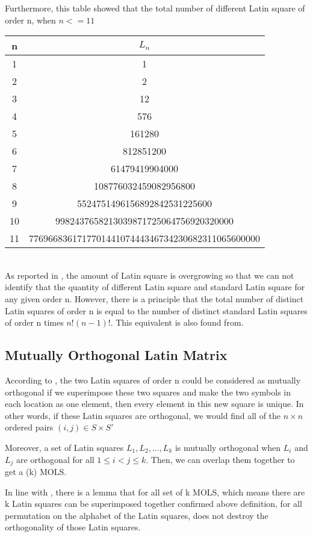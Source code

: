 \documentclass[12pt]{article}
\begin{document}
Furthermore, this table showed that the total number of different Latin square of order n, when $n <= 11$


\begin{tabular}{|c|c|}
\hline
n & $L_n$\\
\hline
1&1\\
2&2\\
3&12\\
4&576\\
5&161280\\
6&812851200\\
7&61479419904000\\
8&108776032459082956800\\
9&5524751496156892842531225600\\
10&9982437658213039871725064756920320000\\
11&776966836171770144107444346734230682311065600000\\
\hline
\end{tabular} \\

As reported in \cite{ref1}, the amount of Latin square is overgrowing so that we can not identify that the quantity of different Latin square and standard Latin square for any given order n. However, there is a principle that the total number of distinct Latin squares of order n is equal to the number of distinct standard Latin squares of order n times $n! (n - 1)!$. This equivalent is also found from\cite{ref2}.

\subsection{Mutually Orthogonal Latin Matrix}

According to \cite{ref11}, the two Latin squares of order n could be considered as mutually orthogonal if we superimpose these two squares and make the two symbols in each location as one element, then every element in this new square is unique. In other words, if these Latin squares are orthogonal, we would find all of the $n \times n$ ordered pairs $(i, j) \in S \times S'$ 

Moreover, a set of Latin squares $L_1, L_2, . . . , L_k$ is mutually orthogonal when $L_i$ and $L_j$ are orthogonal for all $1 \le i < j \le k$. Then, we can overlap them together to get a  (k) MOLS.

In line with \cite{ref1}, there is a lemma that for all set of k MOLS, which means there are k Latin squares can be superimposed together confirmed above definition, for all permutation on the alphabet of the Latin squares, does not destroy the orthogonality of those Latin squares.
\end{document}
